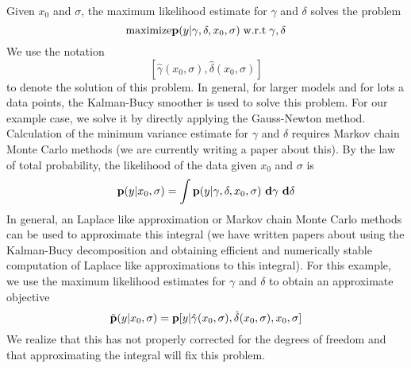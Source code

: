 \documentclass{article}
\newcommand{\Bd}{{\bf d}}
\newcommand{\Bp}{{\bf p}}
\begin{document}
Given \( x_0 \) and \( \sigma \),
the maximum likelihood estimate for \( \gamma \) and \( \delta \)
solves the problem
\[
\mbox{maximize} 
\Bp (y | \gamma , \delta, x_0, \sigma ) 
\; \mbox{w.r.t} \; \gamma , \delta 
\]
We use the notation
\[
[ \hat{\gamma} ( x_0 , \sigma ) , \hat{\delta} ( x_0 , \sigma ) ]
\]
to denote the solution of this problem.
In general, for larger models and for lots a data points,
the Kalman-Bucy smoother is used to solve this problem.
For our example case, we solve it by directly 
applying the Gauss-Newton method.
Calculation of the minimum variance estimate for \( \gamma \)
and \( \delta \) requires Markov chain Monte Carlo methods
(we are currently writing a paper about this).
By the law of total probability,
the likelihood of the data given \( x_0 \) and \( \sigma \) is
\[
\Bp ( y | x_0 , \sigma ) = 
\int \Bp ( y | \gamma , \delta , x_0 , \sigma )
~ \Bd \gamma ~ \Bd \delta
\]
In general, an Laplace like approximation or Markov chain Monte Carlo
methods can be used to approximate this integral
(we have written papers about using the Kalman-Bucy decomposition and
obtaining efficient and numerically stable computation of Laplace like 
approximations to this integral).
For this example, we use the maximum likelihood estimates
for \( \gamma \) and \( \delta \) to obtain an approximate objective
\[
\tilde{ \Bp } ( y | x_0 , \sigma ) =
\Bp [ y | 
	\hat{\gamma} ( x_0 , \sigma ) , 
	\hat{\delta} ( x_0 , \sigma ) , 
	x_0 , 
	\sigma 
]
\]
We realize that this has not properly corrected for the degrees of freedom
and that approximating the integral will fix this problem.
\end{document}
